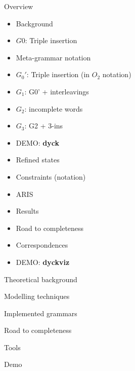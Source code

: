 \documentclass{beamer}
\begin{document}
	\begin{frame}{Overview}
    \begin{itemize}
      \item Background
      \item $G0$: Triple insertion
      \item Meta-grammar notation
      \item $G_0'$: Triple insertion (in $O_2$ notation)
      \item $G_1$: G0' + interleavings
      \item $G_2$: incomplete words
      \item $G_3$: G2 + 3-ins
      \item \alert{DEMO}: \textbf{dyck}
      \item Refined states
      \item Constraints (notation)
      \item ARIS
      \item Results
      \item Road to completeness
      \item Correspondences
      \item \alert{DEMO}: \textbf{dyckviz}
    \end{itemize}
	\end{frame}
  	
  	\begin{frame}{Theoretical background}
  	\end{frame}
  	\begin{frame}{Modelling techniques}
  	\end{frame}
  	\begin{frame}{Implemented grammars}
  	\end{frame}
  	\begin{frame}{Road to completeness}
  	\end{frame}
  	\begin{frame}{Tools}
  	\end{frame}
  	\begin{frame}{Demo}
  	\end{frame}
\end{document}
